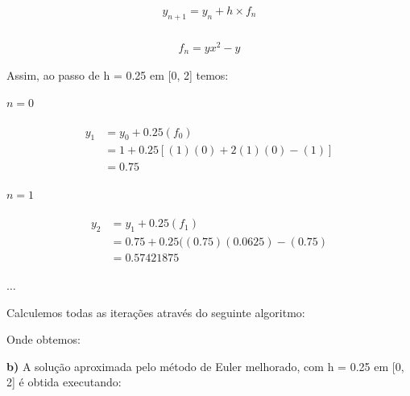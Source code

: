 \documentclass[paper=a4, fontsize=12pt]{scrartcl}
\numberwithin{equation}{section} %
\numberwithin{figure}{section} %
\numberwithin{table}{section} %
\begin{document}
		\begin{align*}
			y_{n + 1} = y_n + h \times f_n \\
		\end{align*}

		\begin{align*}
			f_n = yx^2 - y
		\end{align*}


		\hspace{1.5cm}
		Assim, ao passo de h = 0.25 em [0, 2] temos:
		\hspace{1.5cm}

		$	n = 0	$

		\begin{align*}
			\begin{split}
				y_1 &= 	y_0 + 0.25(f_0) \\
						&=	1	+ 0.25[(1)(0) + 2(1)(0) - (1)] \\
						&=	0.75
			\end{split}
		\end{align*}

		$	n = 1	$

		\begin{align*}
		\begin{split}
		y_2 	&= 	y_1 + 0.25(f_1) \\
					&= 	0.75 + 0.25((0.75)(0.0625) - (0.75) \\
					&=	0.57421875
		\end{split}
		\end{align*}

		$\ldots$

		Calculemos todas as iterações através do seguinte algoritmo:

		\hspace{2cm}

		

		Onde obtemos:


		\textbf{b)} A solução aproximada pelo método de Euler melhorado, com h = 0.25 em [0, 2] é obtida executando:
\end{document}
